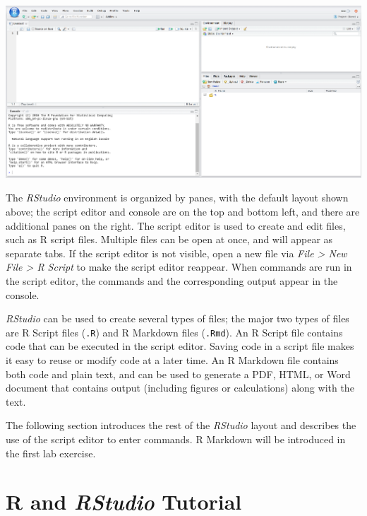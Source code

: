 \documentclass[letterpaper,12pt,twoside,]{pinp}
\begin{document}
\centerline{\includegraphics[width=1\textwidth]{console_layout_web}}

The \emph{RStudio} environment is organized by panes, with the default
layout shown above; the script editor and console are on the top and
bottom left, and there are additional panes on the right. The script
editor is used to create and edit files, such as \textsf{R} script
files. Multiple files can be open at once, and will appear as separate
tabs. If the script editor is not visible, open a new file via
\emph{File \textgreater{} New File \textgreater{} R Script} to make the
script editor reappear. When commands are run in the script editor, the
commands and the corresponding output appear in the console.

\emph{RStudio} can be used to create several types of files; the major
two types of files are R Script files (\texttt{.R}) and R Markdown files
(\texttt{.Rmd}). An R Script file contains code that can be executed in
the script editor. Saving code in a script file makes it easy to reuse
or modify code at a later time. An R Markdown file contains both code
and plain text, and can be used to generate a PDF, HTML, or Word
document that contains output (including figures or calculations) along
with the text.

The following section introduces the rest of the \emph{RStudio} layout
and describes the use of the script editor to enter commands. R Markdown
will be introduced in the first lab exercise.

\hypertarget{and-rstudio-tutorial}{%
\section{\texorpdfstring{\textsf{R} and \emph{RStudio}
Tutorial}{ and RStudio Tutorial}}\label{and-rstudio-tutorial}}
\end{document}
